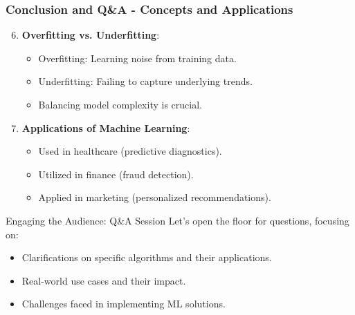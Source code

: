 \documentclass[aspectratio=169]{beamer}
\begin{document}
\begin{frame}[fragile]
    \frametitle{Conclusion and Q\&A - Concepts and Applications}
    \begin{enumerate}\setcounter{enumi}{5}
        \item \textbf{Overfitting vs. Underfitting}:
          \begin{itemize}
              \item Overfitting: Learning noise from training data.
              \item Underfitting: Failing to capture underlying trends.
              \item Balancing model complexity is crucial.
          \end{itemize}
        \item \textbf{Applications of Machine Learning}:
          \begin{itemize}
              \item Used in healthcare (predictive diagnostics).
              \item Utilized in finance (fraud detection).
              \item Applied in marketing (personalized recommendations).
          \end{itemize}
    \end{enumerate}

    \begin{block}{Engaging the Audience: Q\&A Session}
        Let's open the floor for questions, focusing on:
        \begin{itemize}
            \item Clarifications on specific algorithms and their applications.
            \item Real-world use cases and their impact.
            \item Challenges faced in implementing ML solutions.
        \end{itemize}
    \end{block}
\end{frame}
\end{document}
